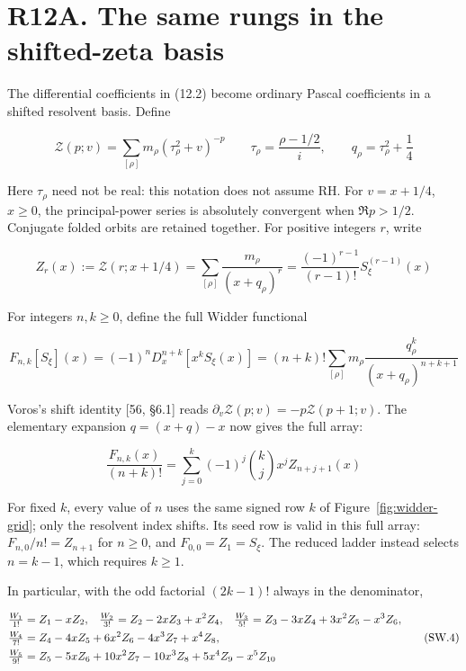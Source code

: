 \documentclass[
  11pt,
]{book}
\newcommand{\figref}[1]{Figure~\ref{#1}}
\begin{document}
\section{R12A. The same rungs in the shifted-zeta
basis}\label{r12a.-the-same-rungs-in-the-shifted-zeta-basis}

The differential coefficients in (12.2) become ordinary Pascal
coefficients in a shifted resolvent basis. Define

\[
\mathcal Z(p;v)=\sum_{[\rho]}m_\rho(\tau_\rho^2+v)^{-p}
\qquad \tau_\rho=\frac{\rho-1/2}{i},\qquad
q_\rho=\tau_\rho^2+\frac14
\tag{SW.1}
\]

Here \(\tau_\rho\) need not be real: this notation does not assume RH.
For \(v=x+1/4\), \(x\ge0\), the principal-power series is absolutely
convergent when \(\Re p>1/2\). Conjugate folded orbits are retained
together. For positive integers \(r\), write

\[
\boxed{Z_r(x):=\mathcal Z(r;x+1/4)
=\sum_{[\rho]}\frac{m_\rho}{(x+q_\rho)^r}
=\frac{(-1)^{r-1}}{(r-1)!}S_\xi^{(r-1)}(x)}
\tag{SW.2}
\]

For integers \(n,k\ge0\), define the full Widder functional

\[
F_{n,k}[S_\xi](x)
=(-1)^nD_x^{n+k}[x^kS_\xi(x)]
=(n+k)!\sum_{[\rho]}m_\rho
\frac{q_\rho^k}{(x+q_\rho)^{n+k+1}}
\tag{13.2}
\]

Voros's shift identity {[}56, §6.1{]} reads
\(\partial_v\mathcal Z(p;v)=-p\mathcal Z(p+1;v)\). The elementary
expansion \(q=(x+q)-x\) now gives the full array:

\[
\boxed{\frac{F_{n,k}(x)}{(n+k)!}
=\sum_{j=0}^k(-1)^j\binom{k}{j}x^jZ_{n+j+1}(x)}
\tag{SW.3}
\]

For fixed \(k\), every value of \(n\) uses the same signed row \(k\) of
\figref{fig:widder-grid}; only the resolvent index shifts. Its seed row
is valid in this full array: \(F_{n,0}/n!=Z_{n+1}\) for \(n\ge0\), and
\(F_{0,0}=Z_1=S_\xi\). The reduced ladder instead selects \(n=k-1\),
which requires \(k\ge1\).

In particular, with the odd factorial \((2k-1)!\) always in the
denominator,

\[
\begin{aligned}
\tfrac{W_1}{1!}&=Z_1-xZ_2,
&\tfrac{W_2}{3!}&=Z_2-2xZ_3+x^2Z_4,
&\tfrac{W_3}{5!}&=Z_3-3xZ_4+3x^2Z_5-x^3Z_6,\\
\tfrac{W_4}{7!}&=\mathrlap{Z_4-4xZ_5+6x^2Z_6-4x^3Z_7+x^4Z_8,}\\
\tfrac{W_5}{9!}&=\mathrlap{Z_5-5xZ_6+10x^2Z_7-10x^3Z_8+5x^4Z_9-x^5Z_{10}}
\end{aligned}
\tag{SW.4}
\]
\end{document}
